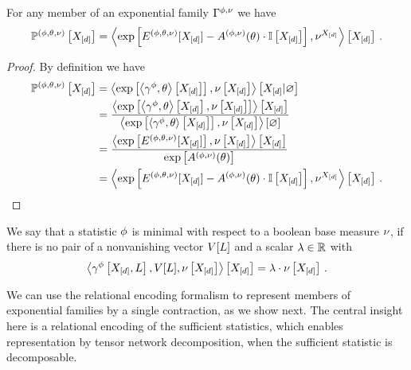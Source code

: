 \begin{lemma}
    \label{lem:energyCumulantRepresentation}
    For any member of an exponential family $\Gamma^{\phi,\nu}$ we have
    \[ \mathbb{P}^{(\phi,\theta,\nu)}\left[X_{[d]}\right]
    = \left\langle \mathrm{exp}\left[ E^{(\phi,\theta,\nu)}[X_{[d]}] - A^{(\phi,\nu)}(\theta)\cdot \mathbb{I}\left[X_{[d]}\right]\right],\nu^{X_{[d]}}\right\rangle \left[ X_{[d]} \right] \, . \]
\end{lemma}
\begin{proof}
    By definition we have
    \begin{align*}
        \mathbb{P}^{(\phi,\theta,\nu)}\left[X_{[d]}\right]
        &= \left\langle 
            \mathrm{exp}\left[\left\langle \gamma^{\phi},\theta\right\rangle \left[ X_{[d]} \right]\right],\nu\left[X_{[d]}\right]
        \right\rangle \left[ X_{[d]} | \varnothing \right] \\
        &= \frac{\left\langle \mathrm{exp}\left[\left\langle \gamma^{\phi},\theta\right\rangle \left[ X_{[d]} \right],\nu\left[X_{[d]}\right]\right]\right\rangle \left[ X_{[d]} \right]
        }{\left\langle \mathrm{exp}\left[\left\langle \gamma^{\phi},\theta    \right\rangle \left[ X_{[d]} \right]\right],\nu\left[X_{[d]}\right]\right\rangle \left[ \varnothing \right]} \\
        &=  \frac{
            \left\langle \mathrm{exp}\left[E^{(\phi,\theta,\nu)}[X_{[d]}]\right],\nu\left[X_{[d]}\right]\right\rangle \left[ X_{[d]} \right]
        }{
            \mathrm{exp}\left[A^{(\phi,\nu)}(\theta)\right]
        } \\
        & = \left\langle \mathrm{exp}\left[ E^{(\phi,\theta,\nu)}[X_{[d]}] - A^{(\phi,\nu)}(\theta)\cdot \mathbb{I}\left[X_{[d]}\right]\right],\nu^{X_{[d]}}\right\rangle \left[ X_{[d]} \right] \, .
    \end{align*}
\end{proof}



\begin{definition}[Minimal]
    \label{def:minimalStatistics}
    We say that a statistic $\phi$ is minimal with respect to a boolean base measure $\nu$, if there is no pair of a nonvanishing vector $V[L]$ and a scalar $\lambda\in\mathbb{R}$ with
    \[ \left\langle \gamma^{\phi}\left[X_{[d]},L\right],V[L],\nu\left[X_{[d]}\right]\right\rangle \left[ X_{[d]} \right] = \lambda\cdot\nu\left[X_{[d]}\right] \, . \]
\end{definition}





We can use the relational encoding formalism to represent members of exponential families by a single contraction, as we show next.
The central insight here is a relational encoding of the sufficient statistics, which enables representation by tensor network decomposition, when the sufficient statistic is decomposable.

